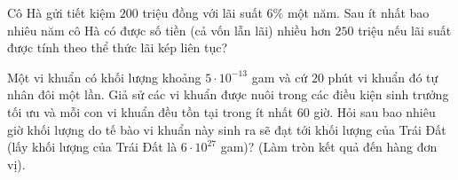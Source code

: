 \begin{bt}%

	Cô Hà gửi tiết kiệm $200$ triệu đồng với lãi suất $6\%$ một năm. Sau ít nhất bao nhiêu năm cô Hà có được số tiền (cả vốn lẫn lãi) nhiều hơn $250$ triệu nếu lãi suất được tính theo thể thức lãi kép liên tục?
	
\end{bt}

\begin{bt}%

	Một vi khuẩn có khối lượng khoảng $5 \cdot 10^{-13}$ gam và cứ $20$ phút vi khuẩn đó tự nhân đôi một lần. Giả sử các vi khuẩn được nuôi trong các điều kiện sinh trưởng tối ưu và mỗi con vi khuẩn đều tồn tại trong ít nhất $60$ giờ. Hỏi sau bao nhiêu giờ khối lượng do tế bào vi khuẩn này sinh ra sẽ đạt tới khối lượng của Trái Đất (lấy khối lượng của Trái Đất là $6 \cdot 10^{27}$ gam)? (Làm tròn kết quả đến hàng đơn vị).
\end{bt}

